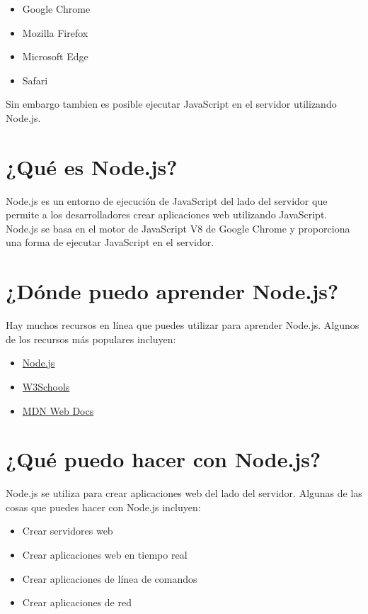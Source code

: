 \documentclass[
  a4paper,
  DIV=11,
  numbers=noendperiod,
  onepage,
  openany]{scrreprt}
\providecommand{\tightlist}{%
  \setlength{\itemsep}{0pt}\setlength{\parskip}{0pt}}\usepackage{longtable,booktabs,array}
\begin{document}
\begin{tcolorbox}
\begin{itemize}
\tightlist
\item
  Google Chrome
\item
  Mozilla Firefox
\item
  Microsoft Edge
\item
  Safari
\end{itemize}

Sin embargo tambien es posible ejecutar JavaScript en el servidor
utilizando Node.js.

\section{¿Qué es Node.js?}\label{quuxe9-es-node.js}

Node.js es un entorno de ejecución de JavaScript del lado del servidor
que permite a los desarrolladores crear aplicaciones web utilizando
JavaScript. Node.js se basa en el motor de JavaScript V8 de Google
Chrome y proporciona una forma de ejecutar JavaScript en el servidor.

\section{¿Dónde puedo aprender
Node.js?}\label{duxf3nde-puedo-aprender-node.js}

Hay muchos recursos en línea que puedes utilizar para aprender Node.js.
Algunos de los recursos más populares incluyen:

\begin{itemize}
\tightlist
\item
  \href{https://nodejs.org/en/docs/}{Node.js}
\item
  \href{https://www.w3schools.com/nodejs/default.asp}{W3Schools}
\item
  \href{https://developer.mozilla.org/en-US/docs/Learn/Server-side/Nodejs}{MDN
  Web Docs}
\end{itemize}

\section{¿Qué puedo hacer con
Node.js?}\label{quuxe9-puedo-hacer-con-node.js}

Node.js se utiliza para crear aplicaciones web del lado del servidor.
Algunas de las cosas que puedes hacer con Node.js incluyen:

\begin{itemize}
\tightlist
\item
  Crear servidores web
\item
  Crear aplicaciones web en tiempo real
\item
  Crear aplicaciones de línea de comandos
\item
  Crear aplicaciones de red
\end{itemize}


\end{tcolorbox}
\end{document}

